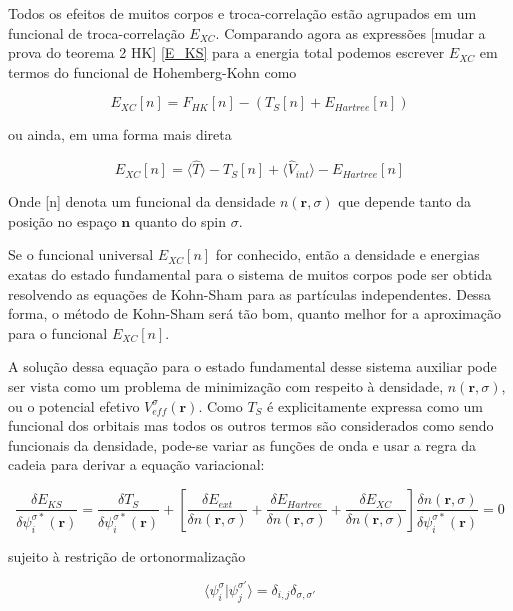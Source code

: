 	Todos os efeitos de muitos corpos e troca-correlação estão agrupados em um funcional de troca-correlação $E_{XC}$. Comparando agora as expressões [mudar a prova do teorema 2 HK] \ref{E_KS} para a energia total podemos escrever $E_{XC}$ em termos do funcional de Hohemberg-Kohn como
	
	\begin{equation}
		E_{XC}[n] = F_{HK}[n] - (T_S[n] + E_{Hartree}[n])
	\end{equation}
	
	ou ainda, em uma forma mais direta
	
	\begin{equation}
	E_{XC}[n] = \langle \hat{T}\rangle - T_S[n] + \langle \hat{V}_{int} \rangle - E_{Hartree}[n]
	\label{e_XC}
	\end{equation}
	
	Onde [n] denota um funcional da densidade $n(\textbf{r}, \sigma)$ que depende tanto da posição no espaço $\textbf{n}$ quanto do spin $\sigma$. 
	
	Se o funcional universal $E_{XC}[n]$ for conhecido, então a densidade e energias exatas do estado fundamental para o sistema de muitos corpos pode ser obtida resolvendo as equações de Kohn-Sham para as partículas independentes. Dessa forma, o método de Kohn-Sham será tão bom, quanto melhor for a aproximação para o funcional $E_{XC}[n]$.
	
	A solução dessa equação para o estado fundamental desse sistema auxiliar pode ser vista como um problema de minimização com respeito à densidade, $n(\textbf{r}, \sigma)$, ou o potencial efetivo $V_{eff}^\sigma(\textbf{r})$. Como $T_S$ é explicitamente expressa como um funcional dos orbitais mas todos os outros termos são considerados como sendo funcionais da densidade, pode-se variar as funções de onda e usar a regra da cadeia para derivar a equação variacional:
	
	\begin{equation}
		\frac{\delta E_{KS}}{\delta \psi_i^{\sigma *}(\textbf{r})} = \frac{\delta T_S}{\delta \psi_i^{\sigma *}(\textbf{r})} + \left[ \frac{\delta E_{ext}}{\delta n(\textbf{r}, \sigma)} + \frac{\delta E_{Hartree}}{\delta n(\textbf{r}, \sigma)} + \frac{\delta E_{XC}}{\delta n(\textbf{r}, \sigma)} \right] \frac{\delta n(\textbf{r}, \sigma)}{\delta \psi_i^{\sigma *}(\textbf{r})} = 0
	\end{equation}
	
	sujeito à restrição de ortonormalização
	
	\begin{equation}
		\langle \psi_i^{\sigma}|\psi_j^{\sigma'}\rangle = \delta_{i,j}\delta_{\sigma, \sigma'}
	\end{equation}
	
